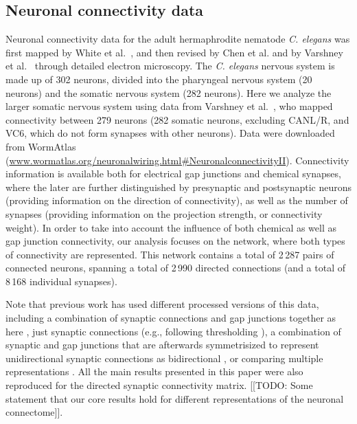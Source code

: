 \documentclass[10pt,letterpaper]{article}
\begin{document}
\subsection*{Neuronal connectivity data}
Neuronal connectivity data for the adult hermaphrodite nematode \emph{C. elegans} was first mapped by White et al.~\cite{White:1986tx}, and then revised by Chen et al. \cite{Chen:2006ie} and by Varshney et al.~\cite{Varshney2011} through detailed electron microscopy.
The \emph{C. elegans} nervous system is made up of 302 neurons, divided into the pharyngeal nervous system (20 neurons) and the somatic nervous system (282 neurons).
Here we analyze the larger somatic nervous system using data from Varshney et al.~\cite{Varshney2011}, who mapped connectivity between 279 neurons (282 somatic neurons, excluding CANL/R, and VC6, which do not form synapses with other neurons).
Data were downloaded from WormAtlas (\url{www.wormatlas.org/neuronalwiring.html#NeuronalconnectivityII}).
Connectivity information is available both for electrical gap junctions and chemical synapses, where the later are further distinguished by presynaptic and postsynaptic neurons (providing information on the direction of connectivity), as well as the number of synapses (providing information on the projection strength, or connectivity weight).
In order to take into account the influence of both chemical as well as gap junction connectivity, our analysis focuses on the network, where both types of connectivity are represented.
This network contains a total of 2\,287 pairs of connected neurons, spanning a total of 2\,990 directed connections (and a total of 8\,168 individual synapses).

Note that previous work has used different processed versions of this data, including a combination of synaptic connections and gap junctions together as here \cite{Azulay:2016cg, Kim:2016gl}, just synaptic connections (e.g., following thresholding \cite{Kashtan:2004ev}), a combination of synaptic and gap junctions that are afterwards symmetrisized to represent unidirectional synaptic connections as bidirectional \cite{Towlson:2013gf, Kim:2014bu, Pavlovic:2014gx}, or comparing multiple representations \cite{Pan:2010jt}.
All the main results presented in this paper were also reproduced for the directed synaptic connectivity matrix.
[[TODO: Some statement that our core results hold for different representations of the neuronal connectome]].
\end{document}

